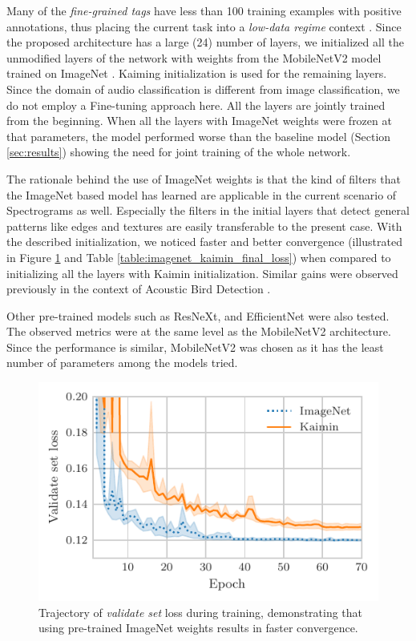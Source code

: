 \documentclass{article}
\begin{document}
\begin{sloppy}
Many of the \textit{fine-grained tags} have less than 100 training examples with positive annotations, thus placing the current task into a \textit{low-data regime} context \cite{pons2018training}. Since the proposed architecture has a large  (24) number of layers, we initialized all the unmodified layers of the network with weights from the MobileNetV2 model trained on ImageNet \cite{russakovsky2015imagenet, mv2weights}. Kaiming initialization \cite{he2015delving} is used for the remaining layers. Since the domain of audio classification is different from image classification, we do not employ a Fine-tuning approach \cite{girshick2014rich} here. All the layers are jointly trained from the beginning. When all the layers with ImageNet weights were frozen at that parameters, the model performed worse than the baseline model (Section \ref{sec:results}) showing the need for joint training of the whole network.

The rationale behind the use of ImageNet weights is that the kind of filters that the ImageNet based model has learned are applicable in the current scenario of Spectrograms as well. Especially the filters in the initial layers that detect general patterns like edges and textures\cite{zeiler2014visualizing} are easily transferable to the present case. With the described initialization, we noticed faster and better convergence (illustrated in Figure \ref{fig:imagenet_kaimin} and Table \ref{table:imagenet_kaimin_final_loss}) when compared to initializing all the layers with Kaimin initialization. Similar gains were observed previously in the context of Acoustic Bird Detection \cite{Lasseck2018}.

Other pre-trained models such as ResNeXt\cite{xie2017aggregated}, and EfficientNet\cite{tan2019efficientnet} were also tested. The observed metrics were at the same level as the MobileNetV2 architecture. Since the performance is similar, MobileNetV2 was chosen as it has the least number of parameters among the models tried.

\begin{figure}[!htbp]
\centering
\includegraphics{example_1.pdf}
\caption{Trajectory of \textit{validate set} loss during training, demonstrating that using pre-trained ImageNet weights results in faster convergence.}
\label{fig:imagenet_kaimin}
\end{figure}


\end{sloppy}
\end{document}
